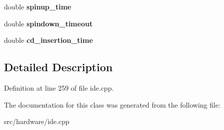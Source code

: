 \begin{DoxyCompactItemize}
\item 
\hypertarget{classIDEController_a8fdce66e9764893c0d4bc4df2d03d80e}{double {\bfseries spinup\-\_\-time}}\label{classIDEController_a8fdce66e9764893c0d4bc4df2d03d80e}

\item 
\hypertarget{classIDEController_a88ffb339927b63d3bf7acdfa4055bb7a}{double {\bfseries spindown\-\_\-timeout}}\label{classIDEController_a88ffb339927b63d3bf7acdfa4055bb7a}

\item 
\hypertarget{classIDEController_a783a444006b92bb95370f2976cd1239f}{double {\bfseries cd\-\_\-insertion\-\_\-time}}\label{classIDEController_a783a444006b92bb95370f2976cd1239f}

\end{DoxyCompactItemize}


\subsection{Detailed Description}


Definition at line 259 of file ide.\-cpp.



The documentation for this class was generated from the following file\-:\begin{DoxyCompactItemize}
\item 
src/hardware/ide.\-cpp\end{DoxyCompactItemize}
